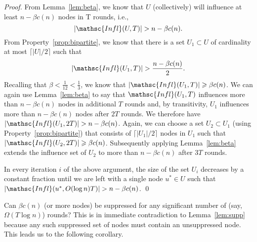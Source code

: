 \documentclass[leqno,11pt]{article}
\renewcommand{\ge}{\geqslant}
\newcommand{\infl}{{\mathsc{Infl}}}
\begin{document}
{\begin{proof}
From Lemma~\ref{lem:beta}, we know that $U$ (collectively) will influence at least $n - \beta
c(n)$ nodes in T rounds, i.e.,
\begin{equation*}|\infl(U,T)| > n- \beta c(n)\text{.}\end{equation*}
From Property~\ref{prop:bipartite}, we know that there is a set $U_1 \subset U$
of cardinality at most $\lceil |U|/2 \rceil$ such that \[|\infl(U_1,T)| >
\frac{n- \beta c(n)}{2}.\]
Recalling
that $\beta < \frac{1}{12} < \frac{1}{3}$, we know that $|\infl(U_1,T)| \ge \beta
c(n)$.  We can again use Lemma~\ref{lem:beta} to say that $\infl(U_1,T)$ influences
more than $n- \beta c(n)$ nodes in additional $T$ rounds and, by transitivity,
$U_1$ influences more than $n- \beta c(n)$ nodes after $2T$ rounds. We therefore
have $|\infl(U_1,2T)| > n- \beta c(n)$. Again, we can choose a set $U_2\subset
U_1$ (using Property~\ref{prop:bipartite}) that consists of $\lceil|U_1|/2\rceil$ nodes in $U_1$ such  that $|\infl(U_2,2T)| \ge \beta c(n)$. Subsequently applying
Lemma~\ref{lem:beta} extends the influence set of $U_2$ to more than $n- \beta c(n)$ after
$3T$ rounds. 

In every iteration $i$ of the above argument, the size of the set $U_i$ decreases
by a constant fraction until we are left with a single node
$u^* \in U$ such that $|\infl(u^*, O(\log n) T)| > n- \beta c(n)$.
\qed
\end{proof}
}

Can $\beta c(n)$ (or more nodes)  be suppressed for any significant number of (say, $\Omega(T \log n)$) rounds? This is in immediate contradiction to Lemma~\ref{lem:supp} because any such suppressed set of nodes must contain an unsuppressed node. This leads us to the following corollary.
\end{document}

